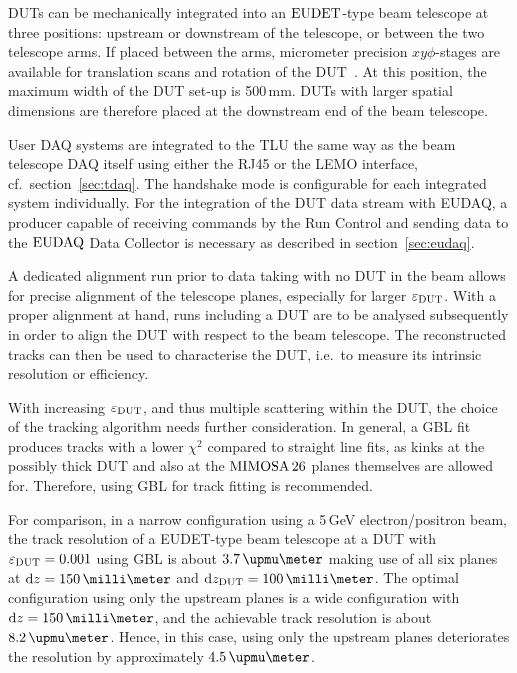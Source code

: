 DUTs can be mechanically integrated into an $\textrm{EUDET}$-type beam telescope at three positions: upstream or downstream of the telescope, or between the two telescope arms.
If placed between the arms, micrometer precision $xy\phi$-stages are available for translation scans and rotation of the DUT~\cite{Mimosa-twiki}.
At this position, the maximum width of the DUT set-up is 500\,mm.
DUTs with larger spatial dimensions are therefore placed at the downstream end of the beam telescope. 

User DAQ systems are integrated to the TLU the same way as the beam telescope DAQ itself using either the RJ45 or the LEMO interface, cf.~section~\ref{sec:tdaq}.
The handshake mode is configurable for each integrated system individually. 
For the integration of the DUT data stream with EUDAQ, a producer capable of receiving commands by the Run Control and sending data to the $\textrm{EUDAQ}$ Data Collector is necessary
 as described in section~\ref{sec:eudaq}.

A dedicated alignment run prior to data taking with no DUT in the beam allows for precise alignment of the telescope planes, especially for larger $\mathnormal{\varepsilon_{\textrm{DUT}}}$. 
With a proper alignment at hand, runs including a DUT are to be analysed subsequently in order to align the DUT with respect to the beam telescope. 
The reconstructed tracks can then be used to characterise the DUT, i.e.~to measure its intrinsic resolution or efficiency. 

With increasing $\mathnormal{\varepsilon_{\textrm{DUT}}}$, and thus multiple scattering within the DUT, the choice of the tracking algorithm needs further consideration. 
In general, a GBL fit produces tracks with a lower $\chi^2$ compared to straight line fits,
 as kinks at the possibly thick DUT and also at the $\textrm{MIMOSA\,26}$ planes themselves are allowed for.
Therefore, using GBL for track fitting is recommended. 

For comparison, in a narrow configuration using a 5\,GeV electron/positron beam,
 the track resolution of a EUDET-type beam telescope at a DUT with $\mathnormal{\varepsilon_{\textrm{DUT}}} = 0.001$ using GBL is about $3.7\,\upmu\meter$ making use of all six planes at $\dz = 150\,\milli\meter$ and $\dzdut = 100\,\milli\meter$.
The optimal configuration using only the upstream planes is a wide configuration with $\dz = 150\,\milli\meter$,
 and the achievable track resolution is about $8.2\,\upmu\meter$. 
Hence, in this case, using only the upstream planes deteriorates the resolution by approximately $4.5\,\upmu\meter$.
